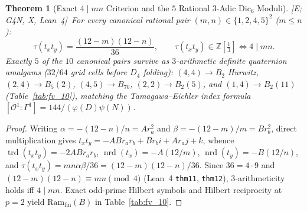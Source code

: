 \documentclass[11pt]{amsart}
\numberwithin{equation}{section}
\theoremstyle{plain}
\newtheorem{theorem}{Theorem}[section]
\theoremstyle{definition}\newtheorem{definition}[theorem]{Definition}
\theoremstyle{remark}\newtheorem{remark}[theorem]{Remark}
\newcommand{\Z}{\mathbb{Z}}
\newcommand{\calO}{\mathcal{O}}
\newcommand{\Dic}{\mathrm{Dic}}
\newcommand{\Ram}{\mathrm{Ram}}
\newcommand{\nrd}{\operatorname{nrd}}
\newcommand{\trd}{\operatorname{trd}}
\newcommand{\ctag}[1]{\textup{\textsf{\scriptsize[#1]}}}
\begin{document}
\begin{theorem}[Exact $4\mid mn$ Criterion and the $5$ Rational $3$-Adic $\Dic_6$ Moduli]\label{thm:fricke_vogt}
\ctag{E; G4N, X, Lean~4}\ For every canonical rational pair $(m,n)\in\{1,2,4,5\}^2$ ($m\le n$):
\begin{equation}\label{eq:tau_tx_ty}
\tau(t_x t_y) = \frac{(12-m)(12-n)}{36}, \qquad \tau(t_x t_y) \in \Z\!\left[\tfrac{1}{3}\right] \iff 4\mid mn.
\end{equation}
Exactly $5$ of the $10$ canonical pairs survive as $3$-arithmetic definite quaternion amalgams ($32/64$ grid cells before $D_4$ folding): $(4,4)\to B_2$ Hurwitz, $(2,4)\to B_5(2)$, $(4,5)\to B_{70}$, $(2,2)\to B_2(5)$, and $(1,4)\to B_2(11)$ (Table~\ref{tab:fv_10}), matching the Tamagawa--Eichler index formula $[\calO^1:\Gamma^1]=144/(\varphi(D)\psi(N))$.
\end{theorem}
\begin{proof}
Writing $\alpha = -(12-n)/n = A r_a^2$ and $\beta = -(12-m)/m = B r_b^2$, direct multiplication gives $t_x t_y = -AB r_a r_b + B r_b i + A r_a j + k$, whence $\trd(t_x t_y) = -2AB r_a r_b$, $\nrd(t_x) = -A(12/m)$, $\nrd(t_y) = -B(12/n)$, and $\tau(t_x t_y) = mn\alpha\beta/36 = (12-m)(12-n)/36$. Since $36=4\cdot 9$ and $(12-m)(12-n)\equiv mn\pmod 4$ (Lean~4 \texttt{thm11}, \texttt{thm12}), $3$-arithmeticity holds iff $4\mid mn$. Exact odd-prime Hilbert symbols and Hilbert reciprocity at $p=2$ yield $\Ram_{\mathrm{fin}}(B)$ in Table~\ref{tab:fv_10}.
\end{proof}
\end{document}
